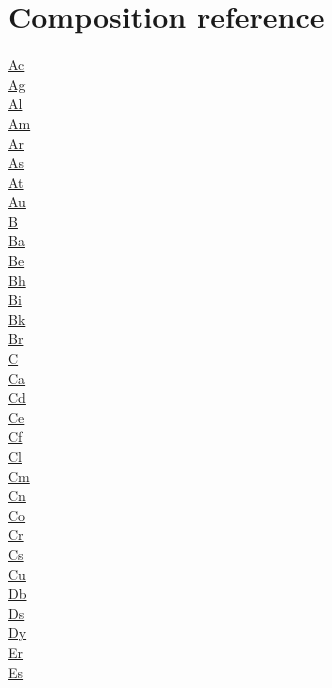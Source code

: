 \documentclass{book}
\begin{document}
\chapter{Composition reference}
\begin{multicols}{3}
\noindent
\hyperref[sec:elem-actinium]{Ac}\\
\hyperref[sec:elem-silver]{Ag}\\
\hyperref[sec:elem-aluminium]{Al}\\
\hyperref[sec:elem-americium]{Am}\\
\hyperref[sec:elem-argon]{Ar}\\
\hyperref[sec:elem-arsenic]{As}\\
\hyperref[sec:elem-astatine]{At}\\
\hyperref[sec:elem-gold]{Au}\\
\hyperref[sec:elem-boron]{B}\\
\hyperref[sec:elem-barium]{Ba}\\
\hyperref[sec:elem-beryllium]{Be}\\
\hyperref[sec:elem-bohrium]{Bh}\\
\hyperref[sec:elem-bismuth]{Bi}\\
\hyperref[sec:elem-berkelium]{Bk}\\
\hyperref[sec:elem-bromine]{Br}\\
\hyperref[sec:elem-carbon]{C}\\
\hyperref[sec:elem-calcium]{Ca}\\
\hyperref[sec:elem-cadmium]{Cd}\\
\hyperref[sec:elem-cerium]{Ce}\\
\hyperref[sec:elem-californium]{Cf}\\
\hyperref[sec:elem-chlorine]{Cl}\\
\hyperref[sec:elem-curium]{Cm}\\
\hyperref[sec:elem-copernicium]{Cn}\\
\hyperref[sec:elem-cobalt]{Co}\\
\hyperref[sec:elem-chromium]{Cr}\\
\hyperref[sec:elem-caesium]{Cs}\\
\hyperref[sec:elem-copper]{Cu}\\
\hyperref[sec:elem-dubnium]{Db}\\
\hyperref[sec:elem-darmstadtium]{Ds}\\
\hyperref[sec:elem-dysprosium]{Dy}\\
\hyperref[sec:elem-erbium]{Er}\\
\hyperref[sec:elem-einsteinium]{Es}\\

\end{multicols}
\end{document}
